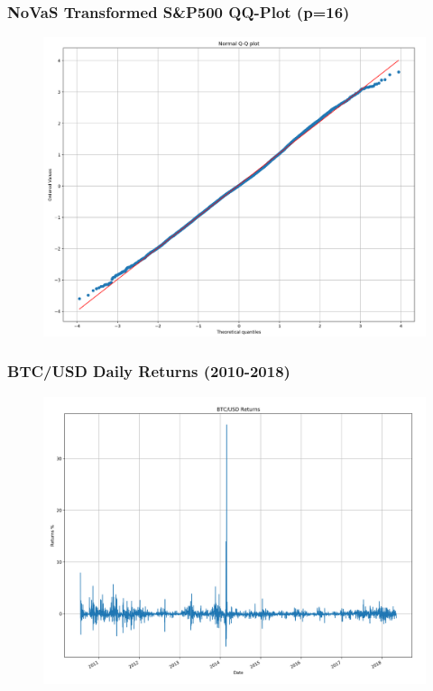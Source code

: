 \documentclass{beamer}
\begin{document}
\begin{frame}
\frametitle{NoVaS Transformed S\&P500 QQ-Plot (p=16)}
\begin{figure}[h!]
\includegraphics[width=\textwidth]{novas_sp500_returns_qqplot.png}
\end{figure}
\end{frame}


\begin{frame}
\frametitle{BTC/USD Daily Returns (2010-2018)}
\begin{figure}[h!]
\centering 
\includegraphics[width=\textwidth]{btc_returns.png}
\end{figure}
\end{frame}
\end{document}
